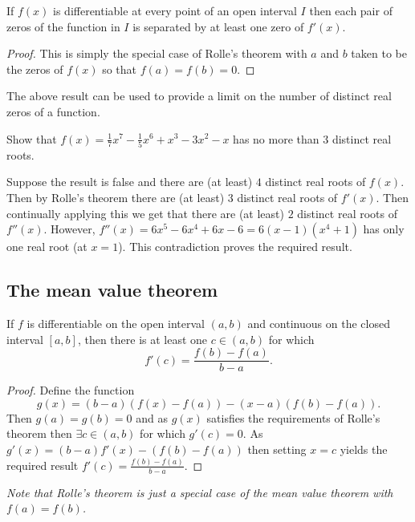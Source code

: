 \documentclass[10pt, a4paper]{article}
\begin{document}
\begin{corollary}
    If $f(x)$ is differentiable at every point of an open interval $I$ then each pair of zeros of the function in $I$ is separated by at least one zero of $f'(x)$.
    \begin{proof}
        This is simply the special case of Rolle's theorem with $a$ and $b$ taken to be the zeros of $f(x)$ so that $f(a) = f(b) = 0$.
    \end{proof}
\end{corollary}
The above result can be used to provide a limit on the number of distinct real zeros of a function.

\begin{example}
    Show that $f(x) = \frac{1}{7}x ^ 7 - \frac{1}{5}x ^ 6 + x ^ 3 - 3x ^ 2 -x$ has no more than $3$ distinct real roots.

    Suppose the result is false and there are (at least) $4$ distinct real roots of $f(x)$.
    Then by Rolle's theorem there are (at least) $3$ distinct real roots of $f'(x)$.
    Then continually applying this we get that there are (at least) $2$ distinct real roots of $f''(x)$.
    However, $f''(x) = 6x ^ 5 - 6x ^ 4 + 6x - 6 = 6(x - 1)(x ^ 4 + 1)$ has only one real root (at $x = 1$).
    This contradiction proves the required result.
\end{example}

\subsection{The mean value theorem}
\begin{theorem}
    If $f$ is differentiable on the open interval $(a, b)$ and continuous on the closed interval $[a, b]$,
    then there is at least one $c \in (a, b)$ for which
    \[
    f'(c) = \frac{f(b) - f(a)}{b - a}.
    \]
    \begin{proof}
        Define the function
        \[
        g(x) = (b - a)(f(x) - f(a)) - (x - a)(f(b) - f(a)).
        \]
        Then $g(a) = g(b) = 0$ and as $g(x)$ satisfies the requirements of Rolle's theorem then $\exists c \in (a, b)$ for which $g'(c) = 0$.
        As $g'(x) = (b - a)f'(x) - (f(b) - f(a))$ then setting $x = c$ yields the required result $f'(c) = \frac{f(b) - f(a)}{b - a}$.
    \end{proof}
\end{theorem}
\textit{Note that Rolle's theorem is just a special case of the mean value theorem with $f(a) = f(b)$.}
\end{document}
